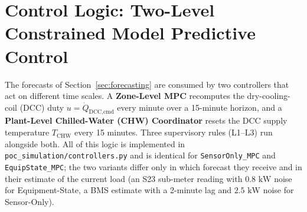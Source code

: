 %
%
%

\section{Control Logic: Two-Level Constrained Model Predictive Control}
\label{sec:mpc}

The forecasts of Section~\ref{sec:forecasting} are consumed by two controllers that act on different time scales. A \textbf{Zone-Level MPC} recomputes the dry-cooling-coil (DCC) duty $u = \dot{Q}_{\text{DCC,cmd}}$ every minute over a 15-minute horizon, and a \textbf{Plant-Level Chilled-Water (CHW) Coordinator} resets the DCC supply temperature $T_{\text{CHW}}$ every 15 minutes. Three supervisory rules (L1--L3) run alongside both. All of this logic is implemented in \texttt{poc\_simulation/controllers.py} and is identical for \texttt{SensorOnly\_MPC} and \texttt{EquipState\_MPC}; the two variants differ only in which forecast they receive and in their estimate of the current load (an S23 sub-meter reading with $0.8\text{ kW}$ noise for Equipment-State, a BMS estimate with a 2-minute lag and $2.5\text{ kW}$ noise for Sensor-Only).

